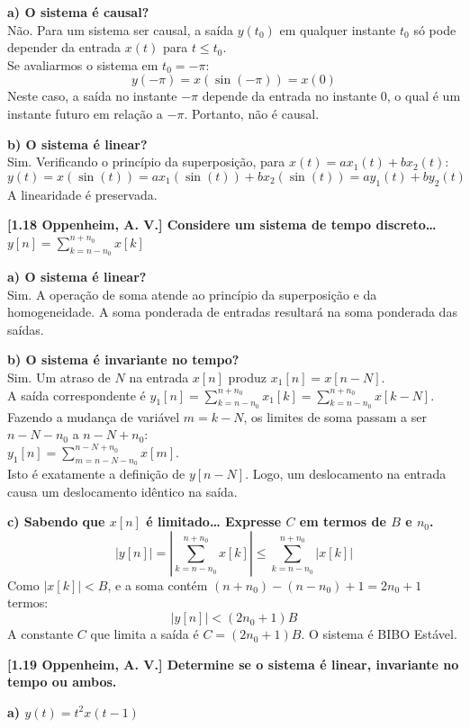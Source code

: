 \textbf{a) O sistema é causal?}\\
Não. Para um sistema ser causal, a saída \(y(t_0)\) em qualquer instante \(t_0\) só pode depender da entrada \(x(t)\) para \(t \le t_0\).\\
Se avaliarmos o sistema em \(t_0 = -\pi\):
\[y(-\pi) = x(\sin(-\pi)) = x(0)\]
Neste caso, a saída no instante \(-\pi\) depende da entrada no instante \(0\), o qual é um instante futuro em relação a \(-\pi\). Portanto, não é causal.

\textbf{b) O sistema é linear?}\\
Sim. Verificando o princípio da superposição, para \(x(t) = ax_1(t) + bx_2(t)\):
\[y(t) = x(\sin(t)) = ax_1(\sin(t)) + bx_2(\sin(t)) = ay_1(t) + by_2(t)\]
A linearidade é preservada.

\textbf{{[}1.18 Oppenheim, A. V.{]} Considere um sistema de tempo discreto\ldots{} \(y[n] = \sum_{k=n-n_0}^{n+n_0} x[k]\)}

\textbf{a) O sistema é linear?}\\
Sim. A operação de soma atende ao princípio da superposição e da homogeneidade. A soma ponderada de entradas resultará na soma ponderada das saídas.

\textbf{b) O sistema é invariante no tempo?}\\
Sim. Um atraso de \(N\) na entrada \(x[n]\) produz \(x_1[n] = x[n-N]\).\\
A saída correspondente é \(y_1[n] = \sum_{k=n-n_0}^{n+n_0} x_1[k] = \sum_{k=n-n_0}^{n+n_0} x[k-N]\).\\
Fazendo a mudança de variável \(m = k-N\), os limites de soma passam a ser \(n-N-n_0\) a \(n-N+n_0\):\\
\(y_1[n] = \sum_{m=n-N-n_0}^{n-N+n_0} x[m]\).\\
Isto é exatamente a definição de \(y[n-N]\). Logo, um deslocamento na entrada causa um deslocamento idêntico na saída.

\textbf{c) Sabendo que \(x[n]\) é limitado\ldots{} Expresse \(C\) em termos de \(B\) e \(n_0\).}
\[|y[n]| = \left| \sum_{k=n-n_0}^{n+n_0} x[k] \right| \le \sum_{k=n-n_0}^{n+n_0} |x[k]|\]
Como \(|x[k]| < B\), e a soma contém \((n+n_0) - (n-n_0) + 1 = 2n_0 + 1\) termos:
\[|y[n]| < (2n_0 + 1)B\]
A constante \(C\) que limita a saída é \(C = (2n_0 + 1)B\). O sistema é BIBO Estável.

\textbf{{[}1.19 Oppenheim, A. V.{]} Determine se o sistema é linear, invariante no tempo ou ambos.}

\textbf{a) \(y(t) = t^2 x(t - 1)\)}

